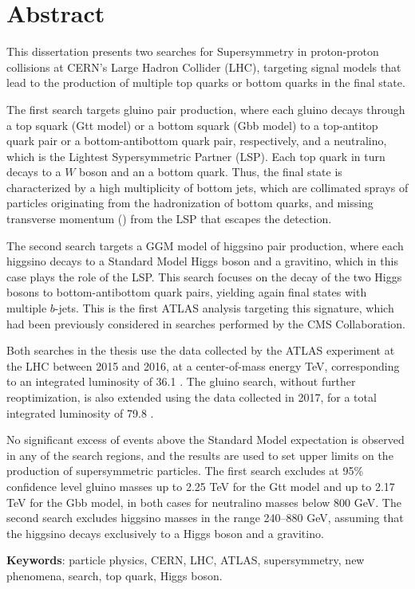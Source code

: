 \chapter*{Abstract}

This dissertation presents two searches for Supersymmetry in proton-proton collisions at CERN's Large Hadron Collider (LHC), 
targeting signal models that lead to the production of multiple top quarks or bottom quarks in the final state.

The first search targets gluino pair production, where each gluino decays through a top squark (Gtt model) or a bottom squark (Gbb model) 
to a top-antitop quark pair or a bottom-antibottom quark pair, respectively, and a neutralino, which is the Lightest Sypersymmetric Partner (LSP).
Each top quark in turn decays to a $W$ boson and an a bottom quark.
Thus, the final state is characterized by a high multiplicity of bottom jets, which are collimated sprays of particles originating from the hadronization of bottom quarks, and 
missing transverse momentum (\met) from the LSP that escapes the detection. 

The second search targets a GGM model of higgsino pair production, 
where each higgsino decays to a Standard Model Higgs boson and 
a gravitino, which in this case plays the role of the LSP. 
This search focuses on the decay of the two Higgs bosons to bottom-antibottom quark pairs, yielding again final states with multiple $b$-jets.
This is the first ATLAS analysis targeting this signature, which had been 
previously considered in searches performed by the CMS Collaboration.

Both searches in the thesis use the data collected by the ATLAS experiment at the LHC 
between 2015 and 2016, at a center-of-mass energy  \cmtre TeV,
corresponding to an integrated luminosity of 36.1 \ifb.
The gluino search, without further reoptimization, is also extended using the data collected in 2017, for a total integrated luminosity of 79.8 \ifb.

No significant excess of events above the Standard Model expectation is observed in any of the search regions, 
and the results are used to set upper limits on the production of supersymmetric particles. 
The first search excludes at 95\% confidence level gluino masses up to 2.25 TeV for the Gtt model 
and up to 2.17 TeV for the Gbb model, in both cases for neutralino masses below 800 GeV.
The second search excludes higgsino masses in the range 240--880 GeV, assuming 
that the higgsino decays exclusively to a Higgs boson and a gravitino. 

\par\bigskip
\par\bigskip 
\par\bigskip

\noindent \textbf{Keywords}: particle physics, CERN, LHC, ATLAS, supersymmetry, new phenomena, search, top quark, Higgs boson. 
